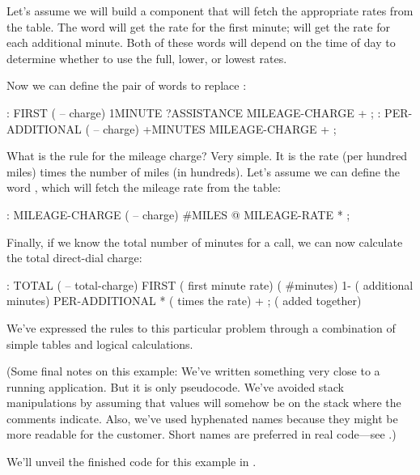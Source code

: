 Let's assume we will build a component that will fetch the appropriate
rates from the table. The word  will get the rate for
the first minute;  will get the rate for each
additional minute.  Both of these words will depend on the time of day
to determine whether to use the full, lower, or lowest rates.

Now we can define the pair of words to replace :


\begin{Code}
: FIRST  ( -- charge)
  1MINUTE  ?ASSISTANCE   MILEAGE-CHARGE + ;
: PER-ADDITIONAL  ( -- charge)
   +MINUTES  MILEAGE-CHARGE + ;
\end{Code}
What is the rule for the mileage charge? Very simple. It is the rate
(per hundred miles) times the number of miles (in hundreds). Let's
assume we can define the word , which will fetch
the mileage rate from the table:

\begin{Code}
: MILEAGE-CHARGE  ( -- charge)
   #MILES @  MILEAGE-RATE * ;
\end{Code}
Finally, if we know the total number of minutes for a call, we can now
calculate the total direct-dial charge:

\begin{Code}
: TOTAL   ( -- total-charge)
   FIRST                        ( first minute rate)
   ( #minutes) 1-               ( additional minutes)
      PER-ADDITIONAL *          ( times the rate)
   +  ;                         ( added together)
\end{Code}
We've expressed the rules to this particular problem through a
combination of simple tables and logical calculations.

(Some final notes on this example: We've written something very close
to a running \Forth{} application. But it is only pseudocode. We've
avoided stack manipulations by assuming that values will somehow be on
the stack where the comments indicate. Also, we've used hyphenated
names because they might be more readable for the customer. Short
names are preferred in real code---see .)\label{phone2}

We'll unveil the finished code for this example in .%
%
%
%
%

